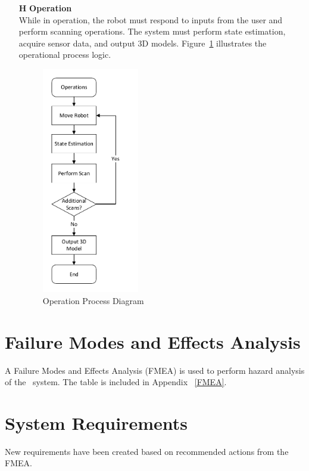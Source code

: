 \documentclass[12pt]{article}
\newcounter{haznum} %
\begin{document}
\begin{itemize}
\item[\textbf{H\refstepcounter{haznum}\thehaznum \label{H2}}] \textbf{Operation}\\
While in operation, the robot must respond to inputs from the user and perform scanning operations. The system must perform state estimation, acquire sensor data, and output 3D models. Figure~\ref{fig_Operation} illustrates the operational process logic.
\begin{figure}[H]
\centering
\includegraphics[width = 0.4\textwidth]{Figures/Operation Processes.pdf}
\caption{Operation Process Diagram}
\label{fig_Operation}
\end{figure}
\end{itemize}

\section{Failure Modes and Effects Analysis}

A Failure Modes and Effects Analysis (FMEA) is used to perform hazard analysis of the \progname ~system. The table is included in Appendix ~\ref{FMEA}.

\section{System Requirements}

New requirements have been created based on recommended actions from the FMEA.
\end{document}
